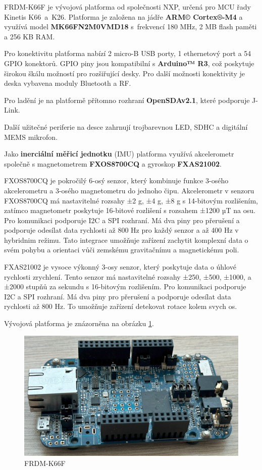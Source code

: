 FRDM-K66F je vývojová platforma od společnosti NXP, určená pro MCU řady Kinetis K66~a~K26.
Platforma je založena na jádře \textbf{ARM© Cortex®-M4} a využívá model \textbf{MK66FN2M0VMD18} s~frekvencí 180 MHz, 2 MB flash paměti a 256 KB RAM.

Pro konektivitu platforma nabízí 2 micro-B USB porty, 1 ethernetový port a 54 GPIO konektorů.
GPIO piny jsou kompatibilní s \textbf{Arduino™ R3}, což poskytuje širokou škálu možností pro rozšiřující desky.
Pro další možnosti konektivity je deska vybavena moduly Bluetooth a RF.

Pro ladění je na platformě přítomno rozhraní \textbf{OpenSDAv2.1}, které podporuje J-Link.

Další užitečné periferie na desce zahrnují trojbarevnou LED, SDHC a digitální MEMS mikrofon.

Jako \textbf{inerciální měřicí jednotku} (IMU) platforma využívá akcelerometr společně s magnetometrem
\textbf{FXOS8700CQ} a gyroskop \textbf{FXAS21002}.\cite{frdmk66UserGuide}

FXOS8700CQ je pokročilý 6-osý senzor, který kombinuje funkce 3-osého akcelerometru
a 3-osého magnetometru do jednoho čipu. Akcelerometr v senzoru FXOS8700CQ má
nastavitelné rozsahy ±2 g, ±4 g, ±8 g s 14-bitovým rozlišením, zatímco magnetometr
poskytuje 16-bitové rozlišení s rozsahem ±1200 µT na osu. Pro komunikaci podporuje
I2C a SPI rozhraní. Má dva piny pro přerušení a podporuje odesílat data rychlosti
až 800 Hz pro každý senzor a až 400 Hz v hybridnim režimu.
Tato integrace umožňuje zařízení zachytit komplexní data o svém pohybu a
orientaci vůči zemskému gravitačnímu a magnetickému poli.\cite{FXOS8700CQ}

FXAS21002 je vysoce výkonný 3-osy senzor, který poskytuje data o úhlové rychlosti
zrychlení. Tento senzor má nastavitelné rozsahy ±250, ±500, ±1000, a ±2000 stupňů za sekundu
s 16-bitovým rozlišením. Pro komunikaci podporuje I2C a SPI rozhraní.
Má dva piny pro přerušení a podporuje odesílat data rychlosti až 800 Hz.
To umožňuje zařízení detekovat rotace kolem svych os.\cite{FXAS21002}

Vývojová platforma je znázorněna na obrázku \ref{fig:FRDM-K66F}.
\begin{figure}[!htbp]
    \centering
    \includegraphics[width = .5\linewidth]{Figures/FRDM-K66F.png}
    \caption{FRDM-K66F}
    \label{fig:FRDM-K66F}
    \vspace{-10pt}
\end{figure}

